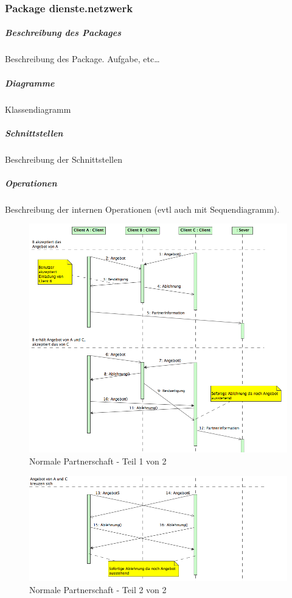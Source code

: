 \documentclass[a4paper,12pt,halfparskip,DIV14]{scrartcl}
\begin{document}
\newpage
\subsubsection{Package dienste.netzwerk} %
\label{ssub:package_dienste_netzwerk}
\subparagraph{Beschreibung des Packages} %
\label{ssub:beschreibung_des_packages}
Beschreibung des Package. Aufgabe, etc…
\subparagraph{Diagramme} %
\label{ssub:diagramme}
Klassendiagramm
\subparagraph{Schnittstellen} %
\label{ssub:schnittstellen}
Beschreibung der Schnittstellen
\subparagraph{Operationen} %
\label{ssub:operationen}
Beschreibung der internen Operationen (evtl auch mit Sequendiagramm).
\begin{figure}
	[htp] \centering 
	\includegraphics[width=1\textwidth]{dienste_partnerschaft_normal_1.png} \caption{Normale Partnerschaft - Teil 1 von 2}\label{fig:dienste_partnerschaft_normal_1.png} 
\end{figure}
\begin{figure}
	[htp] \centering 
	\includegraphics[width=1\textwidth]{dienste_partnerschaft_normal_2.png} \caption{Normale Partnerschaft - Teil 2 von 2}\label{fig:dienste_partnerschaft_normal_2.png} 
\end{figure}
\end{document}
